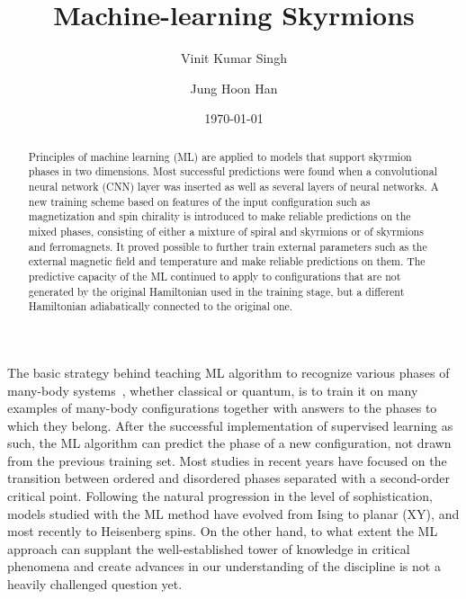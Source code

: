 \documentclass[reprint,amsmath,amssymb,aps,showpacs,superscriptaddress,prl]{revtex4-1}
\begin{document}
%
\title{Machine-learning Skyrmions}

\author{Vinit Kumar Singh}
\author{Jung Hoon Han}
\date{\today}

\begin{abstract}
Principles of machine learning (ML) are applied to models that support skyrmion phases in two dimensions. Most successful predictions were found when a convolutional neural network (CNN) layer was inserted as well as several layers of neural networks. A new training scheme based on features of the input configuration such as magnetization and spin chirality is introduced to make reliable predictions on the mixed phases, consisting of either a mixture of spiral and skyrmions or of skyrmions and ferromagnets. It proved possible to further train external parameters such as the external magnetic field and temperature and make reliable predictions on them. The predictive capacity of the ML continued to apply to configurations that are not generated by the original Hamiltonian used in the training stage, but a different Hamiltonian adiabatically connected to the original one.
\end{abstract}
\maketitle

The basic strategy behind teaching ML algorithm to recognize various phases of many-body systems~\cite{melko16,wang16,melko17,melko17b,melko17c,tanaka17,scalettar17,wetzel17,wetzel17b,iso18,kim18,zhai17,scalettar17,beach18,zhai18,russian18}, whether classical or quantum, is to train it on many examples of many-body configurations together with answers to the phases to which they belong.  After the successful implementation of supervised learning as such, the ML algorithm can predict the phase of a new configuration, not drawn from the previous training set. Most studies in recent years have focused on the transition between ordered and disordered phases separated with a second-order critical point. Following the natural progression in the level of sophistication, models studied with the ML method have evolved from Ising\cite{melko16,wang16,melko17,melko17b,melko17c,tanaka17,scalettar17,wetzel17,wetzel17b,iso18,kim18} to planar (XY)\cite{zhai17,scalettar17,wetzel17b,beach18,zhai18}, and most recently to Heisenberg\cite{russian18} spins. On the other hand, to what extent the ML approach can supplant the well-established tower of knowledge in critical phenomena and create advances in our understanding of the discipline is not a heavily challenged question yet.
\end{document}
